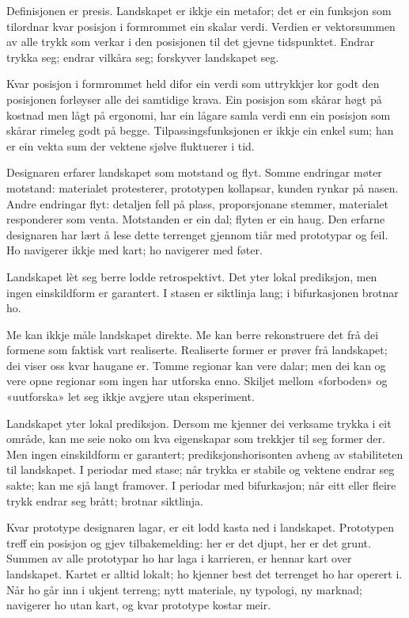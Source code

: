 Definisjonen er presis. Landskapet er ikkje ein metafor; det er ein funksjon som tilordnar kvar posisjon i formrommet ein skalar verdi. Verdien er vektorsummen av alle trykk som verkar i den posisjonen til det gjevne tidspunktet. Endrar trykka seg; endrar vilkåra seg; forskyver landskapet seg.

Kvar posisjon i formrommet held difor ein verdi som uttrykkjer kor godt den posisjonen forløyser alle dei samtidige krava. Ein posisjon som skårar høgt på kostnad men lågt på ergonomi, har ein lågare samla verdi enn ein posisjon som skårar rimeleg godt på begge. Tilpassingsfunksjonen er ikkje ein enkel sum; han er ein vekta sum der vektene sjølve fluktuerer i tid.

Designaren erfarer landskapet som motstand og flyt. Somme endringar møter motstand: materialet protesterer, prototypen kollapsar, kunden rynkar på nasen. Andre endringar flyt: detaljen fell på plass, proporsjonane stemmer, materialet responderer som venta. Motstanden er ein dal; flyten er ein haug. Den erfarne designaren har lært å lese dette terrenget gjennom tiår med prototypar og feil. Ho navigerer ikkje med kart; ho navigerer med føter.

Landskapet lèt seg berre lodde retrospektivt. Det yter lokal prediksjon, men ingen einskildform er garantert. I stasen er siktlinja lang; i bifurkasjonen brotnar ho.

Me kan ikkje måle landskapet direkte. Me kan berre rekonstruere det frå dei formene som faktisk vart realiserte. Realiserte former er prøver frå landskapet; dei viser oss kvar haugane er. Tomme regionar kan vere dalar; men dei kan og vere opne regionar som ingen har utforska enno. Skiljet mellom «forboden» og «uutforska» let seg ikkje avgjere utan eksperiment.

Landskapet yter lokal prediksjon. Dersom me kjenner dei verksame trykka i eit område, kan me seie noko om kva eigenskapar som trekkjer til seg former der. Men ingen einskildform er garantert; prediksjonshorisonten avheng av stabiliteten til landskapet. I periodar med stase; når trykka er stabile og vektene endrar seg sakte; kan me sjå langt framover. I periodar med bifurkasjon; når eitt eller fleire trykk endrar seg brått; brotnar siktlinja.

Kvar prototype designaren lagar, er eit lodd kasta ned i landskapet. Prototypen treff ein posisjon og gjev tilbakemelding: her er det djupt, her er det grunt. Summen av alle prototypar ho har laga i karrieren, er hennar kart over landskapet. Kartet er alltid lokalt; ho kjenner best det terrenget ho har operert i. Når ho går inn i ukjent terreng; nytt materiale, ny typologi, ny marknad; navigerer ho utan kart, og kvar prototype kostar meir.

